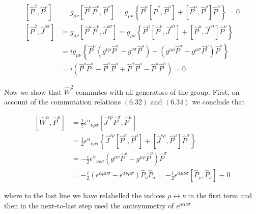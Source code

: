 \documentclass[10pt, letterpaper]{article}
\begin{document}
$$
\begin{aligned}
{\left[\hat{P}^{2}, \hat{P}^{\rho}\right] } & =g_{\mu \nu}\left[\hat{P}^{\mu} \hat{P}^{\nu}, \hat{P}^{\rho}\right]=g_{\mu \nu}\left\{\hat{P}^{\mu}\left[\hat{P}^{\nu}, \hat{P}^{\rho}\right]+\left[\hat{P}^{\mu}, \hat{P}^{\rho}\right] \hat{P}^{\nu}\right\}=0 \\
{\left[\hat{P}^{2}, \hat{J}^{\rho \sigma}\right] } & =g_{\mu \nu}\left[\hat{P}^{\mu} \hat{P}^{\nu}, \hat{J}^{\rho \sigma}\right]=g_{\mu \nu}\left\{\hat{P}^{\mu}\left[\hat{P}^{\nu}, \hat{J}^{\rho \sigma}\right]+\left[\hat{P}^{\mu}, \hat{J}^{\rho \sigma}\right] \hat{P}^{\nu}\right\} \\
& =i g_{\mu \nu}\left\{\hat{P}^{\mu}\left(g^{\nu \rho} \hat{P}^{\sigma}-g^{\nu \sigma} \hat{P}^{\rho}\right)+\left(g^{\mu \rho} \hat{P}^{\sigma}-g^{\mu \sigma} \hat{P}^{\rho}\right) \hat{P}^{\nu}\right\} \\
& =i\left(\hat{P}^{\rho} \hat{P}^{\sigma}-\hat{P}^{\sigma} \hat{P}^{\rho}+\hat{P}^{\sigma} \hat{P}^{\rho}-\hat{P}^{\rho} \hat{P}^{\sigma}\right)=0
\end{aligned}
$$

Now we show that $\hat{W}^{2}$ commutes with all generators of the group. First, on account of the commutation relations $(\boxed{6.32})$ and $(6.34)$ we conclude that

$$
\begin{aligned}
{\left[\hat{W}^{\alpha}, \hat{P}^{\mu}\right] } & =\frac{1}{2} \epsilon^{\alpha}{ }_{\nu \rho \sigma}\left[\hat{J}^{\nu \rho} \hat{P}^{\sigma}, \hat{P}^{\mu}\right] \\
& =\frac{1}{2} \epsilon^{\alpha}{ }_{\nu \rho \sigma}\left\{\hat{J}^{\nu \rho}\left[\hat{P}^{\sigma}, \hat{P}^{\mu}\right]+\left[\hat{J}^{\nu \rho}, \hat{P}^{\mu}\right] \hat{P}^{\sigma}\right\} \\
& =-\frac{i}{2} \epsilon^{\alpha}{ }_{\nu \rho \sigma}\left(g^{\mu \nu} \hat{P}^{\rho}-g^{\mu \rho} \hat{P}^{\nu}\right) \hat{P}^{\sigma} \\
& =-\frac{i}{2}\left(\epsilon^{\alpha \mu \nu \sigma}-\epsilon^{\alpha \nu \mu \sigma}\right) \hat{P}_{\nu} \hat{P}_{\sigma}=-\frac{i}{2} \epsilon^{\alpha \mu \nu \sigma}\left[\hat{P}_{\nu}, \hat{P}_{\sigma}\right] \equiv 0
\end{aligned}
$$

where to the last line we have relabelled the indices $\rho \leftrightarrow \nu$ in the first term and then in the next-to-last step used the antisymmetry of $\epsilon^{\mu \alpha \nu \sigma}$.
\end{document}
